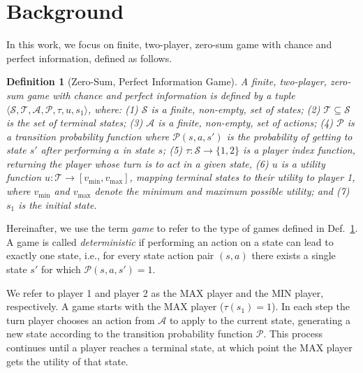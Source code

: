 \documentclass[letterpaper]{article} %
\newcounter{bab}
\newtheorem{definition}{Definition}
\newcommand{\vmax}{v_{\text{max}}}
\newcommand{\vmin}{v_{\text{min}}}
\newcommand{\tuple}[1]{\langle #1 \rangle}
\begin{document}

\section{Background}

In this work, we focus on finite, two-player, zero-sum game with chance and perfect information, defined as follows. 
\begin{definition}[Zero-Sum, Perfect Information Game]
A finite, two-player, zero-sum game with chance and perfect information is defined by a tuple $\tuple{\mathcal{S}, \mathcal{T}, \mathcal{A}, \mathcal{P}, \tau, u, s_1}$, where:
(1) $\mathcal{S}$ is a finite, non-empty, set of states; 
(2) $\mathcal{T}\subseteq \mathcal{S}$ is the set of terminal states; 
(3) $\mathcal{A}$ is a finite, non-empty, set of actions; 
(4) $\mathcal{P}$ is a transition probability function where $\mathcal{P}(s,a,s')$ is the probability of getting to state $s'$ after performing $a$ in state $s$; 
(5) $\tau:\mathcal{S}\rightarrow\{1,2\}$ is a player index function, returning the player whose turn is to act in a given state, 
(6) $u$ is a utility function $u:\mathcal{T}\rightarrow [\vmin,\vmax]$, mapping terminal states to their utility to player 1, where $\vmin$ and $\vmax$ denote the minimum and maximum possible utility; 
and (7) $s_1$ is the initial state. 
\label{def:game-with-chance}
\end{definition}
Hereinafter, we use the term \emph{game} to refer to the type of games defined in Def.~\ref{def:game-with-chance}. A game is called \emph{deterministic} if performing an action on a state can lead to exactly one state, i.e., for every state action pair $(s,a)$ there exists a single state $s'$ for which $\mathcal{P}(s,a,s')=1$. 



We refer to player 1 and player 2 as the MAX player and the MIN player, respectively.
A game starts with the MAX player ($\tau(s_1)=1$). 
In each step the turn player chooses an action from $\mathcal{A}$ to apply to the current state, generating a new state according to the transition probability function $\mathcal{P}$.
This process continues until a player reaches a terminal state, at which point the MAX player gets the utility of that state. %
\end{document}

